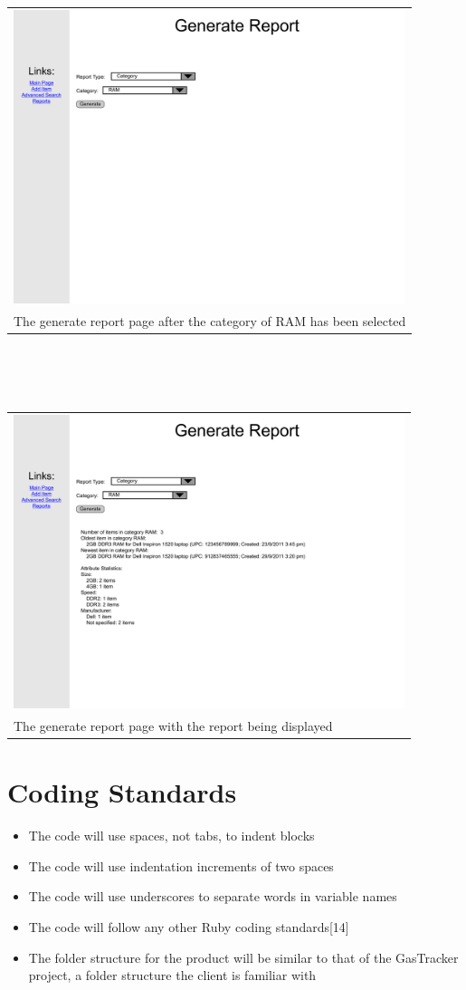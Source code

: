 \documentclass{article}
\begin{document}
\begin{tabular}{ p{4.5in} }
\includegraphics[keepaspectratio, width=4.5in]{generateReportF0S3.pdf} \\
The generate report page after the category of RAM has been selected
\end{tabular}\\
~\\
~\\
\begin{tabular}{ p{4.5in} }
\includegraphics[keepaspectratio, width=4.5in]{generateReportF0S4.pdf} \\
The generate report page with the report being displayed
\end{tabular}

\section{Coding Standards}
\begin{itemize}
\item The code will use spaces, not tabs, to indent blocks
\item The code will use indentation increments of two spaces
\item The code will use underscores to separate words in variable names
\item The code will follow any other Ruby coding standards[14]
\item The folder structure for the product will be similar to that of the GasTracker project, a folder structure the client is familiar with
\end{itemize}
\end{document}

